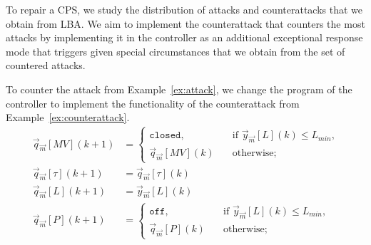 {{To repair a CPS, we study the distribution of attacks and counterattacks that we obtain from LBA. We aim to implement the counterattack that counters the most attacks by implementing it in the controller as an additional exceptional response mode that triggers given special circumstances that we obtain from the set of countered attacks. 
\begin{example}
  To counter the attack from Example~\ref{ex:attack}, we change the program of the controller to implement the functionality of the counterattack from Example~\ref{ex:counterattack}.
\begin{align}
  \label{eq:ControllerStage3Repair}
  \vec{q}_{\vec{m}}[MV](k+1)&=
  \begin{cases}
    \texttt{closed},&\quad \text{if $\vec{y}_{\vec{m}}[L](k)\leq L_{min}$,}\\
    \vec{q}_{\vec{m}}[MV](k)&\quad \text{otherwise;}    
  \end{cases}\\
  \vec{q}_{\vec{m}}[\tau](k+1)&=\vec{q}_{\vec{m}}[\tau](k)\\
\vec{q}_{\vec{m}}[L](k+1)&=\vec{y}_{\vec{m}}[L](k)\\
\vec{q}_{\vec{m}}[P](k+1)&=\begin{cases}
  \texttt{off},&\quad \text{if $\vec{y}_{\vec{m}}[L](k)\leq L_{min}$,}\\
  \vec{q}_{\vec{m}}[P](k)&\quad \text{otherwise;}    
\end{cases}
\end{align}
\end{example}


 
}}
